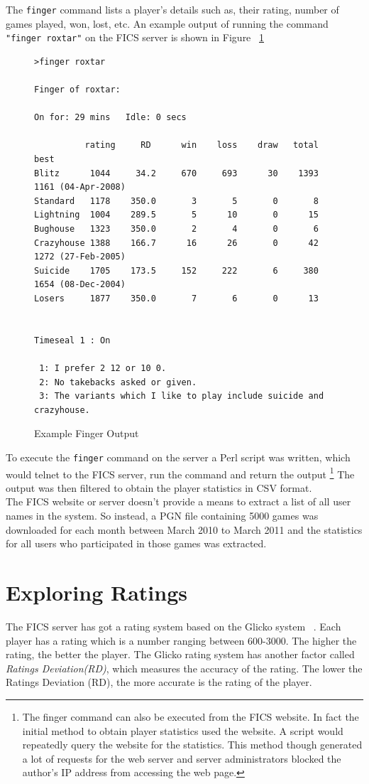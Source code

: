 \documentclass{article}
\begin{document}
The \verb=finger= command lists a player's details such as, their rating, number of games played, won, lost, etc. An example output of running the command \verb="finger roxtar"= on the FICS server is shown in Figure ~\ref{fig:finger}

\begin{figure}[htp]
\begin{verbatim}
>finger roxtar

Finger of roxtar:

On for: 29 mins   Idle: 0 secs

          rating     RD      win    loss    draw   total   best
Blitz      1044     34.2     670     693      30    1393   1161 (04-Apr-2008)
Standard   1178    350.0       3       5       0       8
Lightning  1004    289.5       5      10       0      15
Bughouse   1323    350.0       2       4       0       6
Crazyhouse 1388    166.7      16      26       0      42   1272 (27-Feb-2005)
Suicide    1705    173.5     152     222       6     380   1654 (08-Dec-2004)
Losers     1877    350.0       7       6       0      13


Timeseal 1 : On

 1: I prefer 2 12 or 10 0.
 2: No takebacks asked or given.
 3: The variants which I like to play include suicide and crazyhouse.
\end{verbatim}
\caption{Example Finger Output}
\label{fig:finger}
\end{figure}

\pagebreak

To execute the \verb=finger= command on the server a Perl script was written, which would telnet to the FICS server, run the command and return the output \footnote{The finger command can also be executed from the FICS website. In fact the initial method to obtain player statistics used the website. A script would repeatedly query the website for the statistics. This method though generated a lot of requests for the web server and server administrators blocked the author's IP address from accessing the web page.}  The output was then filtered to obtain the player statistics in CSV format. \\

The FICS website or server doesn't provide a means to extract a list of all user names in the system. So instead, a PGN file containing 5000 games was downloaded for each month between March 2010 to March 2011 and the statistics for all users who participated in those games was extracted. 

\section{Exploring Ratings}
The FICS server has got a rating system based on the Glicko system ~\cite{spec:glicko}. Each player has a rating which is a number ranging between 600-3000. The higher the rating, the better the player. The Glicko rating system has another factor called \textsl{Ratings Deviation(RD)}, which measures the accuracy of the rating. The lower the Ratings Deviation (RD), the more accurate is the rating of the player.\\
\end{document}
